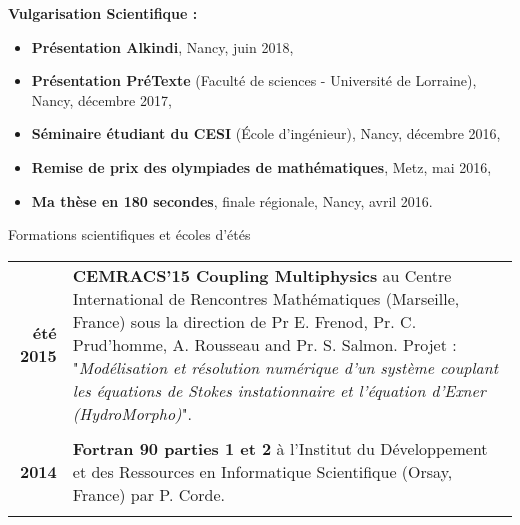 \documentclass[10pt,a4paper]{report}
\def\cvpart{\noindent \hrulefill}
\def\sp{\vspace{6mm}}
\begin{document}
\vspace{0.3cm}
\noindent
{\selectfont
\textbf{Vulgarisation Scientifique :}
}
\begin{itemize}
\item \textbf{Présentation Alkindi}, Nancy, juin 2018,
\item \textbf{Présentation PréTexte }(Faculté de sciences - Université de Lorraine), Nancy, décembre 2017,
\item \textbf{Séminaire étudiant du CESI }(\'Ecole d'ingénieur), Nancy, décembre 2016,
\item \textbf{Remise de prix des olympiades de mathématiques}, Metz, mai 2016,
\item \textbf{Ma thèse en 180 secondes}, finale régionale, Nancy, avril 2016.
\end{itemize}


















\newpage
\sp
{\selectfont
\begin{Large}
Formations scientifiques et écoles d'étés
\end{Large}
\cvpart
}
\sp

\begin{center}
\begin{tabular}{r p{12cm}}
\textbf{été 2015} & \textbf{CEMRACS'15 Coupling Multiphysics} au Centre International de Rencontres Mathématiques (Marseille, France) sous la direction de Pr E. Frenod, Pr. C. Prud'homme, A. Rousseau and Pr. S. Salmon.\newline
Projet : "\textit{Modélisation et résolution numérique d'un système couplant les équations de Stokes instationnaire et l'équation d'Exner (HydroMorpho)}".\\

& \\

\textbf{2014} & \textbf{Fortran 90 parties 1 et 2} à l'Institut du Développement et des Ressources en Informatique Scientifique (Orsay, France) par P. Corde.\\

& \\

\end{tabular}
\end{center}
\end{document}

